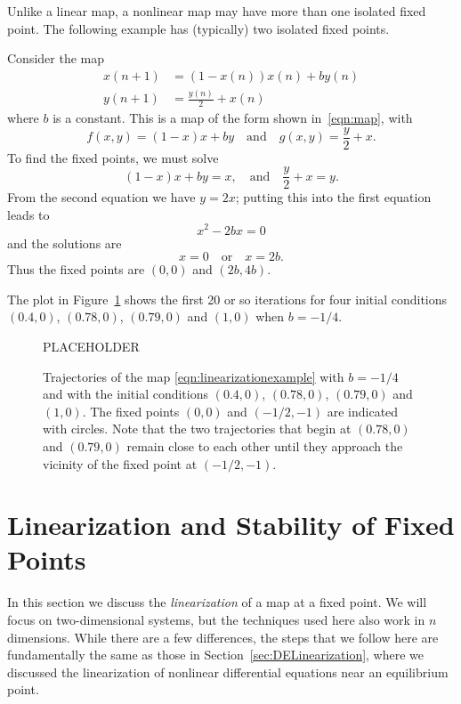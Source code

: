 Unlike a linear map, a nonlinear map may have more than
one isolated fixed point.  The following example
has (typically) two isolated fixed points.
%
\begin{xexample}
Consider the map
\begin{equation}
\begin{split}
  x(n+1) & = (1- x(n))x(n) + b y(n) \\
  y(n+1) & = \frac{y(n)}{2} + x(n)
\end{split}
\label{eqn:linearizationexample}
\end{equation}
where $b$ is a constant.
This is a map of the form shown in~\eqref{eqn:map}, with
\begin{equation}
   f(x,y) = (1-x)x+by \quad \textrm{and} \quad g(x,y) = \frac{y}{2}+x.
\end{equation}
To find the fixed points, we must solve
\begin{equation}
   (1 - x)x + by = x, \quad \textrm{and} \quad \frac{y}{2}+x = y.
\end{equation}
From the second equation we have $y = 2x$; putting this into the first equation
leads to
\begin{equation}
   x^2-2bx = 0
\end{equation}
and the solutions are
\begin{equation}
  x = 0 \quad \textrm{or} \quad x= 2b.
\end{equation}
Thus the fixed points are
$(0,0)$ and $(2b,4b)$.

The plot in Figure~\ref{fig:nonlinearexample}
shows the first 20 or so iterations for four
initial conditions $(0.4,0)$, $(0.78,0)$,
$(0.79,0)$ and $(1,0)$ when $b=-1/4$.
\begin{figure}
\centerline{%
PLACEHOLDER
}
\caption{Trajectories of the map
\eqref{eqn:linearizationexample} with
$b=-1/4$ and with the initial conditions
$(0.4,0)$, $(0.78,0)$,
$(0.79,0)$ and $(1,0)$.
The fixed points $(0,0)$ and $(-1/2,-1)$ are indicated
with circles.
Note that the two trajectories that begin at
$(0.78,0)$ and $(0.79,0)$ remain close to each other
until they approach the vicinity of the
fixed point at $(-1/2,-1)$.
}
\label{fig:nonlinearexample}
\end{figure}
\end{xexample}
%
\newpage
%
\section{Linearization and Stability of Fixed Points}
%
In this section we discuss the \emph{linearization}
of a map at a fixed point. 
We will focus on two-dimensional systems, but the
techniques used here also work in $n$ dimensions.
While there are a few differences, the steps that
we follow here are fundamentally the same as those
in Section~\ref{sec:DELinearization}, where we discussed
the linearization of nonlinear differential equations
near an equilibrium point.

